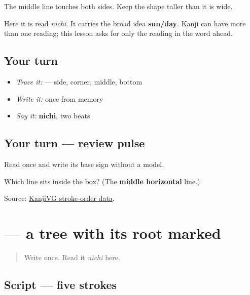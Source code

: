 The middle line touches both sides. Keep the shape taller than it is wide.

Here it is read \emph{nichi}. It carries the broad idea \textbf{sun/day}. Kanji can have more than one reading; this lesson asks for only the reading in the word ahead.

\subsection*{Your turn}
\begin{itemize}
\raggedright
  \item \emph{Trace it:}  — side, corner, middle, bottom
  \item \emph{Write it:}  once from memory
  \item \emph{Say it:} \textbf{nichi}, two beats
\end{itemize}

\subsection*{Your turn — review pulse}
Read \textbf{} once and write its base sign \textbf{} without a model.

\begin{tcolorbox}[breakable,colback=teal!4,colframe=teal!35!black,title={Before you move on}]
Which line sits inside the box? (The \textbf{middle horizontal} line.)

Source: \href{https://kanjivg.tagaini.net/kanjivg/kanji/065e5.html}{KanjiVG stroke-order data}.
\end{tcolorbox}
\section[\texorpdfstring{\ja{本} (hon)}{本 (hon)}]{ — a tree with its root marked}

\label{lesson:JA-W05-hon-kanji}



\begin{quote}
Write  once. Read it \emph{nichi} here.
\end{quote}

\subsection*{Script — five strokes}

